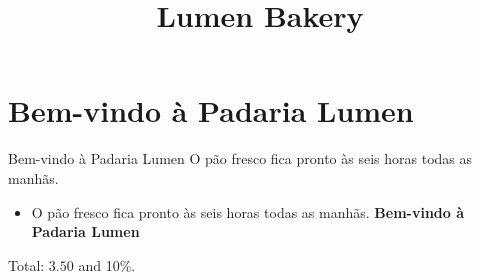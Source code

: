 \documentclass{article}
\title{Lumen Bakery}
\begin{document}
\maketitle
\section{Bem-vindo à Padaria Lumen}
Bem-vindo à Padaria Lumen
O pão fresco fica pronto às seis horas todas as manhãs.

\begin{itemize}
\item O pão fresco fica pronto às seis horas todas as manhãs. \textbf{Bem-vindo à Padaria Lumen}
\end{itemize}
Total: $3.50$ and 10\%.
\end{document}

